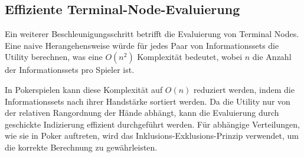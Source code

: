 \subsection{Effiziente Terminal-Node-Evaluierung}

Ein weiterer Beschleunigungsschritt betrifft die Evaluierung von Terminal Nodes.
Eine naive Herangehensweise würde für jedes Paar von Informationssets die Utility berechnen, was eine $O(n^2)$ Komplexität bedeutet, wobei $n$ die Anzahl der Informationssets pro Spieler ist.

In Pokerspielen kann diese Komplexität auf $O(n)$ reduziert werden, indem die Informationssets nach ihrer Handstärke sortiert werden.
Da die Utility nur von der relativen Rangordnung der Hände abhängt, kann die Evaluierung durch geschickte Indizierung effizient durchgeführt werden.
Für abhängige Verteilungen, wie sie in Poker auftreten, wird das Inklusions-Exklusions-Prinzip verwendet, um die korrekte Berechnung zu gewährleisten.
